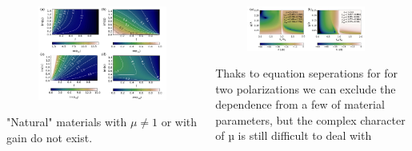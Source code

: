 \documentclass{beamer}
\begin{document}
\begin{frame} [t]
	\begin{columns}
		\begin{column}{0.5\textwidth}
			\begin{figure}[htb]
						\includegraphics[width=\textwidth]{../images/pml/oqe_materials.png}
			\end{figure}
			"Natural" materials with  $\mu \ne 1$ or with gain  do not exist.
		\end{column}
		\begin{column}{0.6\textwidth}
			\begin{figure}[htb]
						\includegraphics[width=0.9\textwidth]{../images/pml/oqe_reflection_kat.png}\\
			\end{figure}
				
		{\tiny Thaks to equation seperations for for two polarizations we can exclude the dependence from a few of material parameters, but the complex character of µ is still difficult to deal with}	


\end{column}
\end{columns}
\end{frame}
\end{document}
